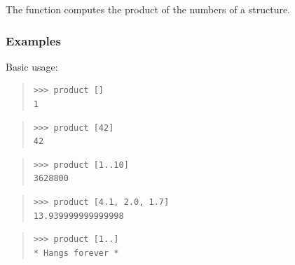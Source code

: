 \begin{haddockdesc}
\item[\begin{tabular}{@{}l}
product :: (Foldable t, Num a) => t a -> a
\end{tabular}]
{\haddockbegindoc
The  function computes the product of the numbers of a
 structure.\par
\subsubsection*{\textbf{Examples}}
Basic usage:\par
\begin{quote}
{\haddockverb\begin{verbatim}
>>> product []
1

\end{verbatim}}
\end{quote}
\begin{quote}
{\haddockverb\begin{verbatim}
>>> product [42]
42

\end{verbatim}}
\end{quote}
\begin{quote}
{\haddockverb\begin{verbatim}
>>> product [1..10]
3628800

\end{verbatim}}
\end{quote}
\begin{quote}
{\haddockverb\begin{verbatim}
>>> product [4.1, 2.0, 1.7]
13.939999999999998

\end{verbatim}}
\end{quote}
\begin{quote}
{\haddockverb\begin{verbatim}
>>> product [1..]
* Hangs forever *

\end{verbatim}}
\end{quote}}
\end{haddockdesc}
